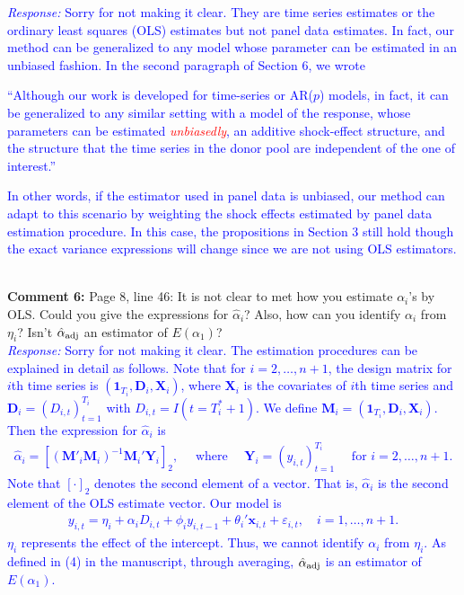 \documentclass[12pt]{article}
\newcommand{\response}[1]{\noindent \textcolor{blue}{\emph{Response:} #1}}
\begin{document}
\response{Sorry for not making it clear. They are time series estimates or the ordinary least squares (OLS) estimates but not panel data estimates. In fact, our method can be generalized to any model whose parameter can be estimated in an unbiased fashion. In the second paragraph of Section 6, we wrote \\


\begin{tcolorbox}
``Although our work is developed for time-series or AR($p$) models, in fact, it can be generalized to any similar setting with a model of the response, whose parameters can be estimated \emph{\textcolor{red}{unbiasedly}}, an additive shock-effect structure, and the structure that the time series in the donor pool are independent of the one of interest.''
\end{tcolorbox}


\vspace{0.4cm}In other words, if the estimator used in panel data is unbiased, our method can adapt to this scenario by weighting the shock effects estimated by panel data estimation procedure. In this case, the propositions in Section 3 still hold though the exact variance expressions will change since we are not using OLS estimators.}\\


{\bf Comment 6:} Page 8, line 46: It is not clear to met how you estimate $\alpha_i$'s by OLS. Could you give the expressions for $\hat{\alpha}_i$? Also, how can you identify $\alpha_i$ from $\eta_i$? Isn't $\hat{\alpha}_{\rm adj}$ an estimator of $E(\alpha_1)$? \\

\response{Sorry for not making it clear. The estimation procedures can be explained in detail as follows. Note that for $i = 2, \ldots, n+1$, the design matrix for $i$th time series is $(\mathbf{1}_{T_i}, \mathbf{D}_{i}, \mathbf{X}_{i})$, where $\mathbf{X}_i$ is the covariates  of $i$th time series and $\mathbf{D}_{i}=(D_{i,t})_{t=1}^{T_i}$ with $D_{i,t}=I(t=T_i^*+1)$. We define $\mathbf{M}_i = (\mathbf{1}_{T_i}, \mathbf{D}_{i}, \mathbf{X}_{i})$. Then the expression for $\hat{\alpha}_i$ is
\begin{align*}
  \hat{\alpha}_i = [(\mathbf{M}'_i\mathbf{M}_i)^{-1}\mathbf{M}_i'\mathbf{Y}_{i}]_{2}, \quad 
  \text{ where }\quad \mathbf{Y}_{i}=(y_{i,t})_{t=1}^{T_i} 
 \quad  \text{ for } i = 2, \ldots, n+1.
\end{align*}
Note that $[\cdot]_{2}$ denotes the second element of a vector. That is, $\hat{\alpha}_i$ is the second element of the OLS estimate vector. Our model is
\begin{align*}
  y_{i,t} = \eta_i + \alpha_i D_{i,t} + \phi_i y_{i,t-1} + \theta_i'\mathbf{x}_{i,t} + \varepsilon_{i,t}, 
  \quad i = 1, \ldots, n+1.
\end{align*}
$\eta_i$ represents the effect of the intercept. Thus, we cannot identify $\alpha_i$ from $\eta_i$. As defined in (4) in the manuscript, through averaging, $\hat{\alpha}_{\rm adj}$ is an estimator  of $E(\alpha_1)$.} \\
\end{document}
